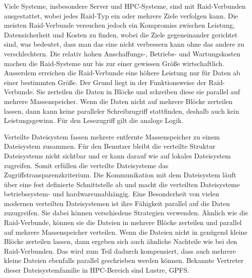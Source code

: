 Viele Systeme, insbesondere Server und HPC-Systeme, sind mit Raid-Verbunden ausgestattet, wobei jedes Raid-Typ ein oder mehrere Ziele verfolgen kann. Die meisten Raid-Verbunde versuchen jedoch ein Kompromiss zwischen Leistung, Datensicherheit und Kosten zu finden, wobei die Ziele gegeneinander gerichtet sind, was bedeutet, dass man das eine nicht verbessern kann ohne das andere zu verschlechtern. Die relativ hohen Anschaffungs-, Betriebs- und Wartungskosten machen die Raid-Systeme nur bis zur einer gewissen Größe wirtschaftlich. Ausserdem erreichen die Raid-Verbunde eine höhere Leistung nur für Daten ab einer bestimmten Größe. Der Grund liegt in der Funktionsweise der Raid-Verbunde. Sie zerteilen die Daten in  Blöcke und schreiben diese sie parallel auf mehrere Massenspeicher. Wenn die Daten nicht auf mehrere Blöcke zerteilen lassen, dann kann keine paralleler Schreibzugriff stattfinden, deshalb auch kein Leistungsgewinn. Für den 
Lesezugriff gilt die analoge Logik.

Verteilte Dateisystem fassen mehrere entfernte Massenspeicher zu einem Dateisystem zusammen. Für den Benutzer bleibt die verteilte Struktur Dateisystems nicht sichtbar und er kann darauf wie auf lokales Dateisystem zugreifen. Somit erfüllen die verteilte Dateisysteme das Zugriffstransparenzkriterium. Die Kommunikation mit dem Dateisystem läuft über eine fest definierte Schnittstelle ab und macht die verteilten Dateisysteme betriebssystem- und hardwareunabhängig. Eine Besonderheit von vielen modernen verteilten Dateisystemen ist ihre Fähigkeit parallel auf die Daten zuzugreifen. Sie dabei können verschiedene Strategien verwenden. Ähnlich wie die Raid-Verbunde, können sie die Dateien in mehrere Blöcke zerteilen und parallel auf mehrere Massenspeicher verteilen.  {\color{red} Wenn die Dateien nicht in genügend kleine Blöcke zerteilen lassen, dann ergeben sich auch ähnliche Nachteile wie bei den Raid-Verbunden. Das wird zum Teil dadurch kompensiert, dass auch mehrere 
kleine Dateien ebenfalls parallel geschrieben werden können.} Bekannte Vertreter dieser Dateisystemfamilie in HPC-Bereich sind Lustre, GPFS. 

